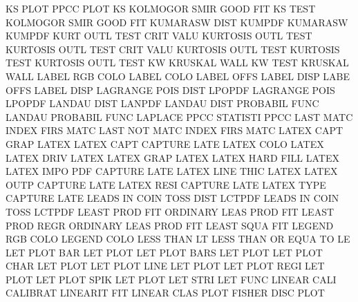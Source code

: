 KS       PLOT                           PPCC     PLOT
KS                                      KOLMOGOR SMIR GOOD FIT
KS       TEST                           KOLMOGOR SMIR GOOD FIT
KUMARASW DIST                           KUMPDF
KUMARASW                                KUMPDF
KURT     OUTL TEST CRIT VALU            KURTOSIS OUTL TEST
KURTOSIS OUTL TEST CRIT VALU            KURTOSIS OUTL TEST
KURTOSIS TEST                           KURTOSIS OUTL TEST
KW                                      KRUSKAL  WALL
KW       TEST                           KRUSKAL  WALL
LABEL    RGB  COLO                      LABEL    COLO
LABEL    OFFS                           LABEL    DISP
LABE     OFFS                           LABEL    DISP
LAGRANGE POIS DIST                      LPOPDF
LAGRANGE POIS                           LPOPDF
LANDAU   DIST                           LANPDF
LANDAU   DIST                           PROBABIL FUNC
LANDAU                                  PROBABIL FUNC
LAPLACE  PPCC                           STATISTI PPCC
LAST     MATC                           INDEX    FIRS MATC
LAST     NOT  MATC                      INDEX    FIRS MATC
LATEX    CAPT GRAP                      LATEX
LATEX    CAPT                           CAPTURE  LATE
LATEX    COLO                           LATEX
LATEX    DRIV                           LATEX
LATEX    GRAP                           LATEX
LATEX    HARD FILL                      LATEX
LATEX    IMPO PDF                       CAPTURE  LATE
LATEX    LINE THIC                      LATEX
LATEX    OUTP                           CAPTURE  LATE
LATEX    RESI                           CAPTURE  LATE
LATEX    TYPE                           CAPTURE  LATE
LEADS    IN   COIN TOSS DIST            LCTPDF
LEADS    IN   COIN TOSS                 LCTPDF
LEAST    PROD FIT                       ORDINARY LEAS PROD FIT
LEAST    PROD REGR                      ORDINARY LEAS PROD FIT
LEAST    SQUA                           FIT
LEGEND   RGB  COLO                      LEGEND   COLO
LESS     THAN                           LT
LESS     THAN OR   EQUA TO              LE
LET      PLOT BAR                       LET      PLOT
LET      PLOT BARS                      LET      PLOT
LET      PLOT CHAR                      LET      PLOT
LET      PLOT LINE                      LET      PLOT
LET      PLOT REGI                      LET      PLOT
LET      PLOT SPIK                      LET      PLOT
LET      STRI                           LET      FUNC
LINEAR   CALI                           CALIBRAT
LINEARIT                                FIT
LINEAR   CLAS PLOT                      FISHER   DISC PLOT
